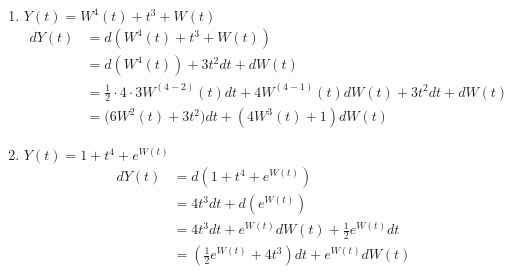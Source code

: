 \documentclass[12pt,twoside, letter]{exam}
\theoremstyle{definition}
\begin{document}
\begin{solution}
  \begin{enumerate}
    \item $Y(t) = W^4(t) + t^3 + W(t)$
      \begin{align*}
        dY(t) &= d(W^4(t) + t^3 + W(t)) \\
         &= d(W^4(t)) + 3t^2 dt + dW(t) \\
         &= \frac{1}{2}\cdot 4 \cdot 3 W^(4-2)(t) dt + 4W^(4-1)(t) dW(t) + 3t^2 dt + dW(t) \\
         &= \bigg(6W^2(t) + 3t^2 \bigg) dt + (4W^3(t) + 1) dW(t)
      \end{align*}
    \item $Y(t) = 1 + t^4 + e^{W(t)}$
      \begin{align*}
        dY(t) &= d(1 + t^4 + e^{W(t)}) \\
        &= 4t^3 dt + d(e^{W(t)}) \\
        &= 4t^3 dt + e^{W(t)} dW(t) + \frac{1}{2} e^{W(t)} dt \\
        &= (\frac{1}{2} e^{W(t)} + 4t^3) dt + e^{W(t)} dW(t)
      \end{align*}
  \end{enumerate}
\end{solution}
\end{document}
